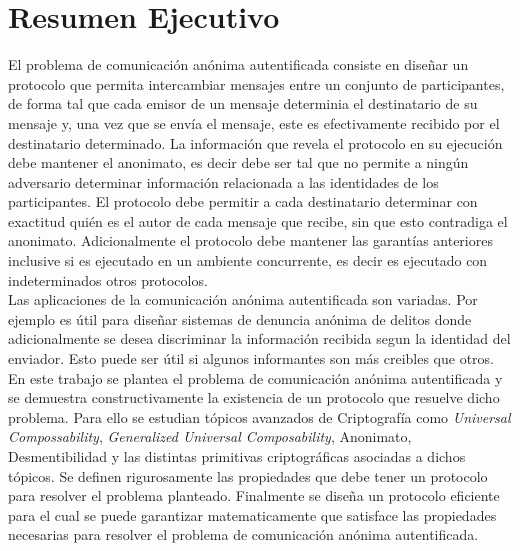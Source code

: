 \section{Resumen Ejecutivo}

El problema de comunicación anónima autentificada consiste en diseñar un protocolo
que permita intercambiar mensajes entre un conjunto de participantes, de forma tal
que cada emisor de un mensaje determinia el destinatario de su
mensaje y, una vez que se envía el mensaje,  este es efectivamente recibido por el destinatario
determinado. La información que revela el protocolo en su ejecución debe mantener el
anonimato, es decir debe ser tal que no permite a ningún adversario determinar 
información relacionada a las identidades  de los participantes.
El protocolo debe permitir a cada destinatario determinar con exactitud quién es el autor
de cada mensaje que recibe, sin que esto contradiga el anonimato.
Adicionalmente el protocolo debe mantener las garantías anteriores inclusive si es ejecutado en
un ambiente concurrente, es decir es ejecutado con indeterminados otros protocolos.\\
Las aplicaciones de la comunicación anónima autentificada son variadas. Por ejemplo es útil
para diseñar sistemas de denuncia anónima de delitos donde adicionalmente se desea discriminar
la información recibida segun la identidad del enviador. Esto puede ser útil si algunos
informantes son más creibles que otros.\\
En este trabajo se plantea el problema de comunicación anónima autentificada y se
demuestra constructivamente la existencia de un protocolo que resuelve dicho problema.
Para ello se estudian tópicos avanzados de Criptografía como \textit{Universal
Compossability}, \textit{Generalized Universal Composability}, Anonimato,
Desmentibilidad y las distintas primitivas criptográficas asociadas a dichos tópicos.
Se definen rigurosamente las propiedades que debe tener un protocolo para
resolver el problema planteado.
Finalmente se diseña un protocolo eficiente para el cual se puede garantizar
matematicamente que satisface las propiedades necesarias para resolver el problema
de comunicación anónima autentificada.
